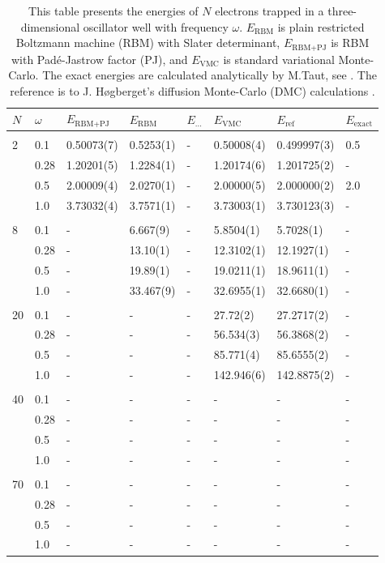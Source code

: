 \begin{table} [H]
	\caption{This table presents the energies of $N$ electrons trapped in a three-dimensional oscillator well with frequency $\omega$. $E_{\text{RBM}}$ is plain restricted Boltzmann machine (RBM) with Slater determinant, $E_{\text{RBM+PJ}}$ is RBM with Padé-Jastrow factor (PJ), and $E_{\text{VMC}}$ is standard variational Monte-Carlo. The exact energies are calculated analytically by M.Taut, see \cite{taut_two_1993}. The reference is to J. Høgberget's diffusion Monte-Carlo (DMC) calculations \cite{hogberget_quantum_2013}. } 
	\begin{tabularx}{\textwidth}{l:l|XXXXXX} \hline\hline
		\label{tab:quantumdotswinteraction3D}
		$N$ & $\omega$ & $E_{\text{RBM+PJ}}$ & $E_{\text{RBM}}$ & $E_{\text{...}}$ & $E_{\text{VMC}}$ & $E_{\text{ref}} $ & $E_{\text{exact}}$ \\ \hline \\
		2 & 0.1 & 0.50073(7) & 0.5253(1) & - & 0.50008(4) & 0.499997(3) & 0.5 \\
		& 0.28 & 1.20201(5) & 1.2284(1) & - & 1.20174(6) & 1.201725(2) & - \\
		& 0.5 & 2.00009(4) & 2.0270(1) & - & 2.00000(5) & 2.000000(2) & 2.0 \\
		& 1.0 & 3.73032(4) & 3.7571(1) & - & 3.73003(1) & 3.730123(3) & - \\ \hdashline \\
		
		8 & 0.1 & - & 6.667(9) & - & 5.8504(1) & 5.7028(1) & -\\ 
		& 0.28 & - & 13.10(1) & - & 12.3102(1) & 12.1927(1) & -\\
		& 0.5 & - & 19.89(1) & - & 19.0211(1) & 18.9611(1) & -\\
		& 1.0 & - & 33.467(9) & - & 32.6955(1) & 32.6680(1) & -\\ \hdashline \\
		
		20 & 0.1 & - & - & - & 27.72(2) & 27.2717(2) & -\\ 
		& 0.28 & - & - & - & 56.534(3) & 56.3868(2) & -\\
		& 0.5 & - & - & - & 85.771(4) & 85.6555(2) & -\\
		& 1.0 & - & - & - & 142.946(6) & 142.8875(2) & -\\ \hdashline \\
		
		40 & 0.1 & - & - & - & - & - & -\\ 
		& 0.28 & - & - & - & - & - & -\\
		& 0.5 & - & - & - & - & - & -\\
		& 1.0 & - & - & - & - & - & -\\ \hdashline \\
		
		70 & 0.1 & - & - & - & - & - & -\\ 
		& 0.28 & - & - & - & - & - & -\\
		& 0.5 & - & - & - & - & - & -\\
		& 1.0 & - & - & - & - & - & -\\ \hline\hline
	\end{tabularx}
\end{table}

